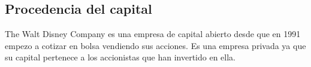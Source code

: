 \subsection{Procedencia del capital}
The Walt Disney Company es una empresa de capital abierto desde que en 1991 empezo a cotizar en bolsa vendiendo sus acciones. Es una empresa privada ya que su capital pertenece a los accionistas que han invertido en ella.